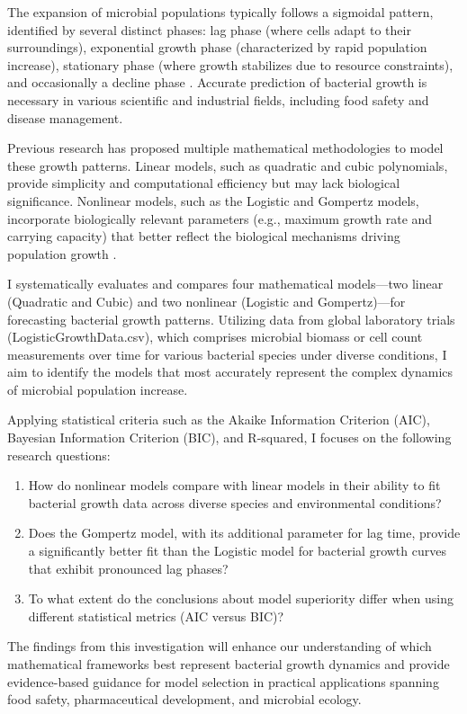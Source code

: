 \documentclass[11pt]{article}
\begin{document}
The expansion of microbial populations typically follows a sigmoidal pattern, identified by several distinct phases: lag phase (where cells adapt to their surroundings), exponential growth phase (characterized by rapid population increase), stationary phase (where growth stabilizes due to resource constraints), and occasionally a decline phase \citep{Lobete2015}. Accurate prediction of bacterial growth is necessary in various scientific and industrial fields, including food safety and disease management.

Previous research has proposed multiple mathematical methodologies to model these growth patterns. Linear models, such as quadratic and cubic polynomials, provide simplicity and computational efficiency but may lack biological significance. Nonlinear models, such as the Logistic and Gompertz models, incorporate biologically relevant parameters (e.g., maximum growth rate and carrying capacity) that better reflect the biological mechanisms driving population growth \citep{Huang2013}.

I systematically evaluates and compares four mathematical models—two linear (Quadratic and Cubic) and two nonlinear (Logistic and Gompertz)—for forecasting bacterial growth patterns. Utilizing data from global laboratory trials (LogisticGrowthData.csv), which comprises microbial biomass or cell count measurements over time for various bacterial species under diverse conditions, I aim to identify the models that most accurately represent the complex dynamics of microbial population increase.

Applying statistical criteria such as the Akaike Information Criterion (AIC), Bayesian Information Criterion (BIC), and R-squared, I focuses on the following research questions:
\begin{enumerate}
    \item How do nonlinear models compare with linear models in their ability to fit bacterial growth data across diverse species and environmental conditions?
    \item Does the Gompertz model, with its additional parameter for lag time, provide a significantly better fit than the Logistic model for bacterial growth curves that exhibit pronounced lag phases?
    \item To what extent do the conclusions about model superiority differ when using different statistical metrics (AIC versus BIC)?
\end{enumerate}

The findings from this investigation will enhance our understanding of which mathematical frameworks best represent bacterial growth dynamics and provide evidence-based guidance for model selection in practical applications spanning food safety, pharmaceutical development, and microbial ecology.
\end{document}
